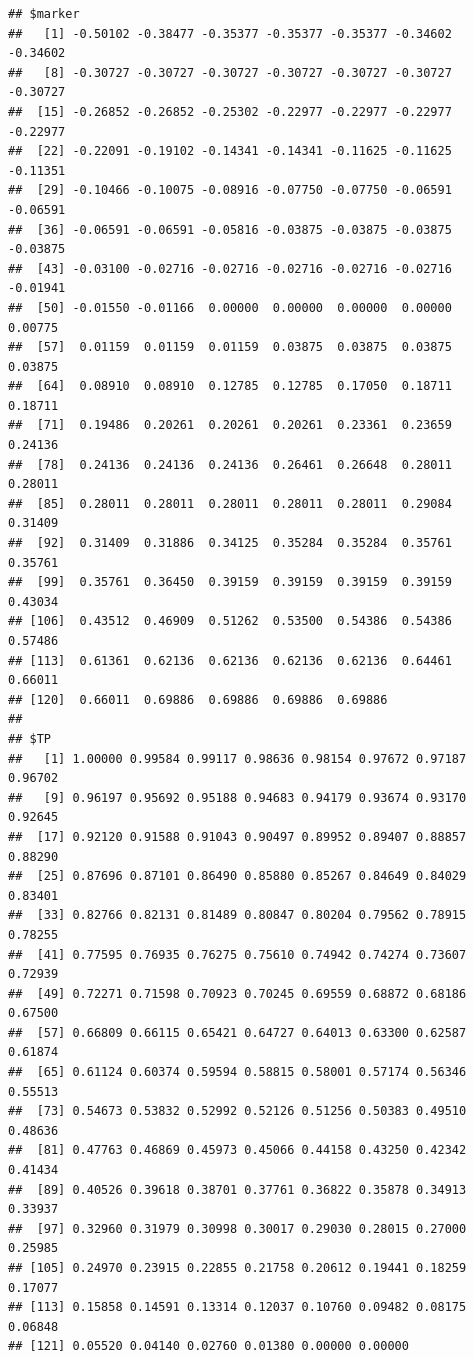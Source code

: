 \documentclass{article}\usepackage[]{graphicx}\usepackage[]{color}
\makeatletter
\newenvironment{kframe}{%
 \def\at@end@of@kframe{}%
 \ifinner\ifhmode%
  \def\at@end@of@kframe{\end{minipage}}%
  \begin{minipage}{\columnwidth}%
 \fi\fi%
 \def\FrameCommand##1{\hskip\@totalleftmargin \hskip-\fboxsep
 \colorbox{shadecolor}{##1}\hskip-\fboxsep
     \hskip-\linewidth \hskip-\@totalleftmargin \hskip\columnwidth}%
 \MakeFramed {\advance\hsize-\width
   \@totalleftmargin\z@ \linewidth\hsize
   \@setminipage}}%
 {\par\unskip\endMakeFramed%
 \at@end@of@kframe}
\newenvironment{knitrout}{}{} %
\makeatother
\begin{document}
\begin{knitrout}
{}


\begin{kframe}\begin{verbatim}
## $marker
##   [1] -0.50102 -0.38477 -0.35377 -0.35377 -0.35377 -0.34602 -0.34602
##   [8] -0.30727 -0.30727 -0.30727 -0.30727 -0.30727 -0.30727 -0.30727
##  [15] -0.26852 -0.26852 -0.25302 -0.22977 -0.22977 -0.22977 -0.22977
##  [22] -0.22091 -0.19102 -0.14341 -0.14341 -0.11625 -0.11625 -0.11351
##  [29] -0.10466 -0.10075 -0.08916 -0.07750 -0.07750 -0.06591 -0.06591
##  [36] -0.06591 -0.06591 -0.05816 -0.03875 -0.03875 -0.03875 -0.03875
##  [43] -0.03100 -0.02716 -0.02716 -0.02716 -0.02716 -0.02716 -0.01941
##  [50] -0.01550 -0.01166  0.00000  0.00000  0.00000  0.00000  0.00775
##  [57]  0.01159  0.01159  0.01159  0.03875  0.03875  0.03875  0.03875
##  [64]  0.08910  0.08910  0.12785  0.12785  0.17050  0.18711  0.18711
##  [71]  0.19486  0.20261  0.20261  0.20261  0.23361  0.23659  0.24136
##  [78]  0.24136  0.24136  0.24136  0.26461  0.26648  0.28011  0.28011
##  [85]  0.28011  0.28011  0.28011  0.28011  0.28011  0.29084  0.31409
##  [92]  0.31409  0.31886  0.34125  0.35284  0.35284  0.35761  0.35761
##  [99]  0.35761  0.36450  0.39159  0.39159  0.39159  0.39159  0.43034
## [106]  0.43512  0.46909  0.51262  0.53500  0.54386  0.54386  0.57486
## [113]  0.61361  0.62136  0.62136  0.62136  0.62136  0.64461  0.66011
## [120]  0.66011  0.69886  0.69886  0.69886  0.69886
## 
## $TP
##   [1] 1.00000 0.99584 0.99117 0.98636 0.98154 0.97672 0.97187 0.96702
##   [9] 0.96197 0.95692 0.95188 0.94683 0.94179 0.93674 0.93170 0.92645
##  [17] 0.92120 0.91588 0.91043 0.90497 0.89952 0.89407 0.88857 0.88290
##  [25] 0.87696 0.87101 0.86490 0.85880 0.85267 0.84649 0.84029 0.83401
##  [33] 0.82766 0.82131 0.81489 0.80847 0.80204 0.79562 0.78915 0.78255
##  [41] 0.77595 0.76935 0.76275 0.75610 0.74942 0.74274 0.73607 0.72939
##  [49] 0.72271 0.71598 0.70923 0.70245 0.69559 0.68872 0.68186 0.67500
##  [57] 0.66809 0.66115 0.65421 0.64727 0.64013 0.63300 0.62587 0.61874
##  [65] 0.61124 0.60374 0.59594 0.58815 0.58001 0.57174 0.56346 0.55513
##  [73] 0.54673 0.53832 0.52992 0.52126 0.51256 0.50383 0.49510 0.48636
##  [81] 0.47763 0.46869 0.45973 0.45066 0.44158 0.43250 0.42342 0.41434
##  [89] 0.40526 0.39618 0.38701 0.37761 0.36822 0.35878 0.34913 0.33937
##  [97] 0.32960 0.31979 0.30998 0.30017 0.29030 0.28015 0.27000 0.25985
## [105] 0.24970 0.23915 0.22855 0.21758 0.20612 0.19441 0.18259 0.17077
## [113] 0.15858 0.14591 0.13314 0.12037 0.10760 0.09482 0.08175 0.06848
## [121] 0.05520 0.04140 0.02760 0.01380 0.00000 0.00000

\end{verbatim}
\end{kframe}
\end{knitrout}
\end{document}

